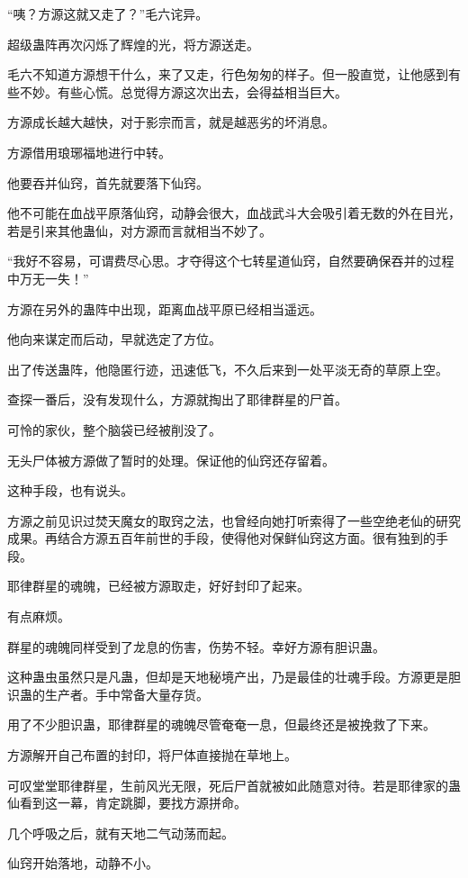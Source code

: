 \begin{this_body}
“咦？方源这就又走了？”毛六诧异。

超级蛊阵再次闪烁了辉煌的光，将方源送走。

毛六不知道方源想干什么，来了又走，行色匆匆的样子。但一股直觉，让他感到有些不妙。有些心慌。总觉得方源这次出去，会得益相当巨大。

方源成长越大越快，对于影宗而言，就是越恶劣的坏消息。

方源借用琅琊福地进行中转。

他要吞并仙窍，首先就要落下仙窍。

他不可能在血战平原落仙窍，动静会很大，血战武斗大会吸引着无数的外在目光，若是引来其他蛊仙，对方源而言就相当不妙了。

“我好不容易，可谓费尽心思。才夺得这个七转星道仙窍，自然要确保吞并的过程中万无一失！”

方源在另外的蛊阵中出现，距离血战平原已经相当遥远。

他向来谋定而后动，早就选定了方位。

出了传送蛊阵，他隐匿行迹，迅速低飞，不久后来到一处平淡无奇的草原上空。

查探一番后，没有发现什么，方源就掏出了耶律群星的尸首。

可怜的家伙，整个脑袋已经被削没了。

无头尸体被方源做了暂时的处理。保证他的仙窍还存留着。

这种手段，也有说头。

方源之前见识过焚天魔女的取窍之法，也曾经向她打听索得了一些空绝老仙的研究成果。再结合方源五百年前世的手段，使得他对保鲜仙窍这方面。很有独到的手段。

耶律群星的魂魄，已经被方源取走，好好封印了起来。

有点麻烦。

群星的魂魄同样受到了龙息的伤害，伤势不轻。幸好方源有胆识蛊。

这种蛊虫虽然只是凡蛊，但却是天地秘境产出，乃是最佳的壮魂手段。方源更是胆识蛊的生产者。手中常备大量存货。

用了不少胆识蛊，耶律群星的魂魄尽管奄奄一息，但最终还是被挽救了下来。

方源解开自己布置的封印，将尸体直接抛在草地上。

可叹堂堂耶律群星，生前风光无限，死后尸首就被如此随意对待。若是耶律家的蛊仙看到这一幕，肯定跳脚，要找方源拼命。

几个呼吸之后，就有天地二气动荡而起。

仙窍开始落地，动静不小。


\end{this_body}
